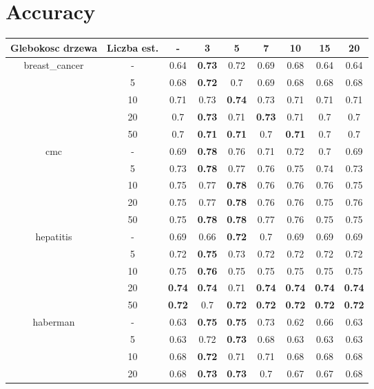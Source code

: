 \documentclass{article}%
\begin{document}
%
\normalsize%
\section*{Accuracy}%
\begin{tabular}{c|c|ccccccc}%
\hline%
Glebokosc drzewa&Liczba est.&{-}&3&5&7&10&15&20\\%
\hline%
\multirow{5}{*}{breast\_cancer}&{-}&0.64&\textbf{0.73}&0.72&0.69&0.68&0.64&0.64\\%
\cline{2%
-%
9}%
&5&0.68&\textbf{0.72}&0.7&0.69&0.68&0.68&0.68\\%
\cline{2%
-%
9}%
&10&0.71&0.73&\textbf{0.74}&0.73&0.71&0.71&0.71\\%
\cline{2%
-%
9}%
&20&0.7&\textbf{0.73}&0.71&\textbf{0.73}&0.71&0.7&0.7\\%
\cline{2%
-%
9}%
&50&0.7&\textbf{0.71}&\textbf{0.71}&0.7&\textbf{0.71}&0.7&0.7\\%
\hline%
\multirow{5}{*}{cmc}&{-}&0.69&\textbf{0.78}&0.76&0.71&0.72&0.7&0.69\\%
\cline{2%
-%
9}%
&5&0.73&\textbf{0.78}&0.77&0.76&0.75&0.74&0.73\\%
\cline{2%
-%
9}%
&10&0.75&0.77&\textbf{0.78}&0.76&0.76&0.76&0.75\\%
\cline{2%
-%
9}%
&20&0.75&0.77&\textbf{0.78}&0.76&0.76&0.75&0.76\\%
\cline{2%
-%
9}%
&50&0.75&\textbf{0.78}&\textbf{0.78}&0.77&0.76&0.75&0.75\\%
\hline%
\multirow{5}{*}{hepatitis}&{-}&0.69&0.66&\textbf{0.72}&0.7&0.69&0.69&0.69\\%
\cline{2%
-%
9}%
&5&0.72&\textbf{0.75}&0.73&0.72&0.72&0.72&0.72\\%
\cline{2%
-%
9}%
&10&0.75&\textbf{0.76}&0.75&0.75&0.75&0.75&0.75\\%
\cline{2%
-%
9}%
&20&\textbf{0.74}&\textbf{0.74}&0.71&\textbf{0.74}&\textbf{0.74}&\textbf{0.74}&\textbf{0.74}\\%
\cline{2%
-%
9}%
&50&\textbf{0.72}&0.7&\textbf{0.72}&\textbf{0.72}&\textbf{0.72}&\textbf{0.72}&\textbf{0.72}\\%
\hline%
\multirow{5}{*}{haberman}&{-}&0.63&\textbf{0.75}&\textbf{0.75}&0.73&0.62&0.66&0.63\\%
\cline{2%
-%
9}%
&5&0.63&0.72&\textbf{0.73}&0.68&0.63&0.63&0.63\\%
\cline{2%
-%
9}%
&10&0.68&\textbf{0.72}&0.71&0.71&0.68&0.68&0.68\\%
\cline{2%
-%
9}%
&20&0.68&\textbf{0.73}&\textbf{0.73}&0.7&0.67&0.67&0.68\\%

\end{tabular}
\end{document}
